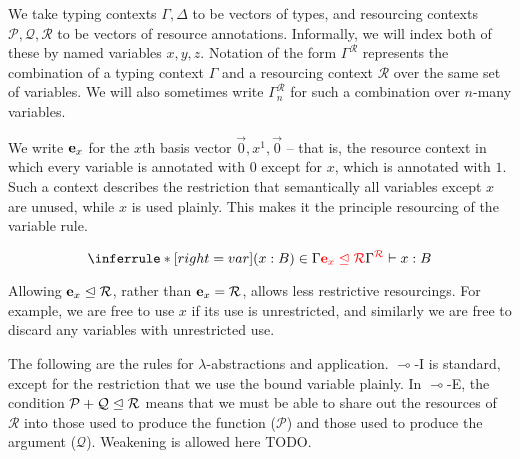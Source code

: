 We take typing contexts $\Gamma, \Delta$ to be vectors of types, and resourcing
contexts $\mathcal P, \mathcal Q, \mathcal R$ to be vectors of resource
annotations.
Informally, we will index both of these by named variables $x, y, z$.
Notation of the form $\Gamma^{\mathcal R}$ represents the combination of a
typing context $\Gamma$ and a resourcing context $\mathcal R$ over the same set
of variables.
We will also sometimes write $\Gamma_n^{\mathcal R}$ for such a combination over
$n$-many variables.

We write $\mathbf{e}_{x}$ for the $x$th basis vector $\vec 0, x^1, \vec 0$ -- that is,
the resource context in which every variable is annotated with $0$ except for
$x$, which is annotated with $1$.
Such a context describes the restriction that semantically all variables except
$x$ are unused, while $x$ is used plainly.
This makes it the principle resourcing of the variable rule.

\[
\inferrule*[right=var]
{(x : B) \in \Gamma
  \\ \subrctx{\basis x}{\mathcal R}
}
{\ctx{\Gamma}{\mathcal R} \vdash x : B}
\]

Allowing $\mathbf{e}_{x} \trianglelefteq \mathcal R$, rather than $\mathbf{e}_{x} = \mathcal R$,
allows less restrictive resourcings.
For example, we are free to use $x$ if its use is unrestricted, and similarly we
are free to discard any variables with unrestricted use.

The following are the rules for $\lambda$-abstractions and application.
$\multimap$-I is standard, except for the restriction that we use the bound
variable plainly.
In $\multimap$-E, the condition $\mathcal P + \mathcal Q \trianglelefteq \mathcal R$
means that we must be able to share out the resources of $\mathcal R$ into
those used to produce the function ($\mathcal P$) and those used to produce the
argument ($\mathcal Q$).
Weakening is allowed here TODO.


